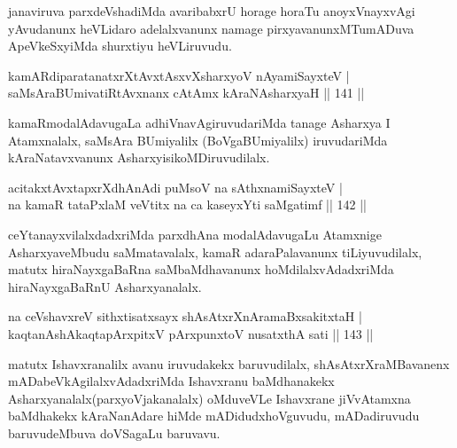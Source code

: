 \begin{artha}
janaviruva parxdeVshadiMda avaribabxrU horage horaTu anoyxVnayxvAgi yAvudanunx heVLidaro 
adelalxvanunx namage pirxyavanunxMTumADuva ApeVkeSxyiMda  shurxtiyu heVLiruvudu.
\end{artha}



\begin{shl}
kamARdiparatanatxrXtAvxtAsxvXsharxyoV nAyamiSayxteV |\\
saMsAraBUmivatiRtAvxnanx cA\s \s tAmx kAraNAsharxyaH \hfill || 141 ||
\end{shl}

\begin{artha}
kamaRmodalAdavugaLa adhiVnavAgiruvudariMda tanage Asharxya I Atamxnalalx, saMsAra 
BUmiyalilx (BoVgaBUmiyalilx) iruvudariMda kAraNatavxvanunx AsharxyisikoMDiruvudilalx.
\end{artha}


\begin{shl}
acitakxtAvxtapxrXdhAnAdi puMsoV na sAthxnamiSayxteV |\\
na kamaR tataPxlaM veVtitx na ca kaseyxYti saMgatimf \hfill || 142 ||
\end{shl}

\begin{artha}
ceYtanayxvilalxdadxriMda parxdhAna modalAdavugaLu Atamxnige AsharxyaveMbudu saMmatavalalx, kamaR adaraPalavanunx tiLiyuvudilalx, matutx hiraNayxgaBaRna saMbaMdhavanunx hoMdilalxvAdadxriMda hiraNayxgaBaRnU Asharxyanalalx.
\end{artha}


\begin{shl}
na ceVshavxreV sithxtisatxsayx shAsAtxrXnAramaBxsakitxtaH |\\
kaqtanAshAkaqtapArxpitxV pArxpunxtoV nusatxthA sati \hfill || 143 ||
\end{shl}

\begin{artha}
matutx Ishavxranalilx avanu iruvudakekx baruvudilalx, shAsAtxrXraMBavanenx mADabeVkAgilalxvAdadxriMda Ishavxranu baMdhanakekx Asharxyanalalx(parxyoVjakanalalx) oMduveVLe Ishavxrane jiVvAtamxna baMdhakekx kAraNanAdare hiMde mADidudxhoVguvudu, mADadiruvudu baruvudeMbuva doVSagaLu baruvavu.
\end{artha}

